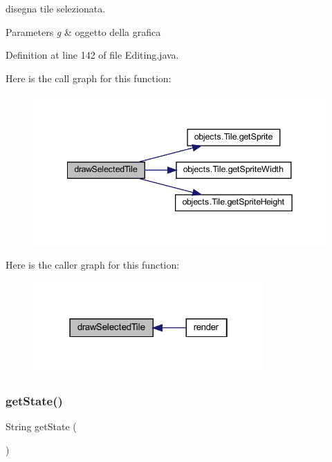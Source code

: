 disegna tile selezionata. 


\begin{DoxyParams}{Parameters}
{\em g} & oggetto della grafica \\
\hline
\end{DoxyParams}


Definition at line 142 of file Editing.\+java.

Here is the call graph for this function\+:\nopagebreak
\begin{figure}[H]
\begin{center}
\leavevmode
\includegraphics[width=342pt]{classscenes_1_1_editing_aa0f35d91a41dfb53af7bdd7d4a76916f_cgraph}
\end{center}
\end{figure}
Here is the caller graph for this function\+:\nopagebreak
\begin{figure}[H]
\begin{center}
\leavevmode
\includegraphics[width=250pt]{classscenes_1_1_editing_aa0f35d91a41dfb53af7bdd7d4a76916f_icgraph}
\end{center}
\end{figure}
\mbox{\label{classscenes_1_1_editing_ae514afc7c85c1cee14d2862a8b0e07b3}} 
\subsubsection{\texorpdfstring{get\+State()}{getState()}}
{\footnotesize\ttfamily String get\+State (\begin{DoxyParamCaption}{ }\end{DoxyParamCaption})}



